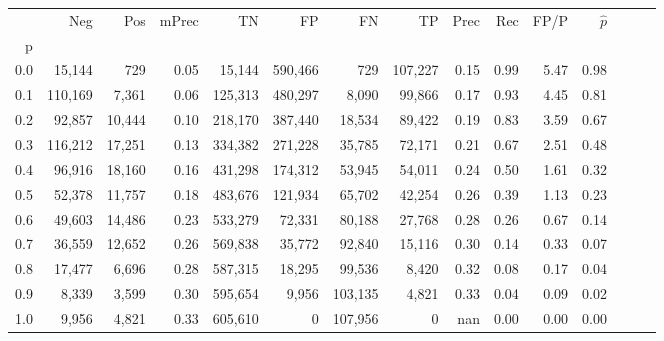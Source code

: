 \begin{tabular}{rrrrrrrrrrrrrrr}
\toprule
{} &      Neg &     Pos & mPrec &       TN &       FP &       FN &       TP &  Prec &   Rec &  FP/P & $\hat{p}$ \\
p   &          &         &       &          &          &          &          &       &       &       &           \\
\midrule
0.0 &   15,144 &     729 &  0.05 &   15,144 &  590,466 &      729 &  107,227 &  0.15 &  0.99 &  5.47 &      0.98 \\
0.1 &  110,169 &   7,361 &  0.06 &  125,313 &  480,297 &    8,090 &   99,866 &  0.17 &  0.93 &  4.45 &      0.81 \\
0.2 &   92,857 &  10,444 &  0.10 &  218,170 &  387,440 &   18,534 &   89,422 &  0.19 &  0.83 &  3.59 &      0.67 \\
0.3 &  116,212 &  17,251 &  0.13 &  334,382 &  271,228 &   35,785 &   72,171 &  0.21 &  0.67 &  2.51 &      0.48 \\
0.4 &   96,916 &  18,160 &  0.16 &  431,298 &  174,312 &   53,945 &   54,011 &  0.24 &  0.50 &  1.61 &      0.32 \\
0.5 &   52,378 &  11,757 &  0.18 &  483,676 &  121,934 &   65,702 &   42,254 &  0.26 &  0.39 &  1.13 &      0.23 \\
0.6 &   49,603 &  14,486 &  0.23 &  533,279 &   72,331 &   80,188 &   27,768 &  0.28 &  0.26 &  0.67 &      0.14 \\
0.7 &   36,559 &  12,652 &  0.26 &  569,838 &   35,772 &   92,840 &   15,116 &  0.30 &  0.14 &  0.33 &      0.07 \\
0.8 &   17,477 &   6,696 &  0.28 &  587,315 &   18,295 &   99,536 &    8,420 &  0.32 &  0.08 &  0.17 &      0.04 \\
0.9 &    8,339 &   3,599 &  0.30 &  595,654 &    9,956 &  103,135 &    4,821 &  0.33 &  0.04 &  0.09 &      0.02 \\
1.0 &    9,956 &   4,821 &  0.33 &  605,610 &        0 &  107,956 &        0 &   nan &  0.00 &  0.00 &      0.00 \\
\bottomrule
\end{tabular}
